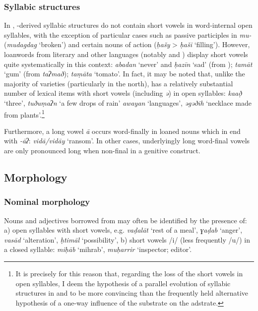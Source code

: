 \documentclass[output=paper]{langsci/langscibook}
\begin{document}
\subsubsection{Syllabic structures} %

In , -derived syllabic structures do not contain short vowels in word-internal open syllables, with the exception of particular cases such as {passive} participles in \textit{mu-} (\textit{mudagdag} ‘broken’) and certain nouns of action (\textit{ḥašy} > \textit{ḥaši} ‘filling’). However, {loanwords} from literary  and other languages (notably  and ) display short vowels quite systematically in this context: \textit{abadan} ‘never’ and \textit{ḥazīn} ‘sad’ (from  ); \textit{tamāt} ‘gum’ (from  \textit{taʔmað}); \textit{taṃāta} ‘tomato’. In fact, it may be noted that, unlike the majority of  varieties (particularly in the north),  has a relatively substantial number of lexical items with short vowels (including \textit{ə}) in open syllables: \textit{ka{\R}að̣} ‘three’, \textit{tuðu}\textit{ṃaʔn} ‘a few drops of rain’ \textit{awayan} ‘languages’, \textit{əgəðih} ‘necklace made from plants'.\footnote{It is precisely for this reason that, regarding the loss of the short vowels in open syllables, I deem the hypothesis of a parallel evolution of syllabic structures in   and  to be more convincing than the frequently held alternative hypothesis of a one-way influence of the  {substrate} on the  {adstrate}.} 

Furthermore, a {long vowel} \textit{ā} occurs word-finally in loaned nouns which in   end with \textit{{}-āʔ}: \textit{vidā/vidāy} ‘ransom’. In other cases, underlyingly long word-final vowels are only pronounced long when non-final in a genitive construct.

\subsection{Morphology} %

\subsubsection{Nominal morphology} %


Nouns and adjectives borrowed from   may often be identified by the presence of: a) open syllables with short vowels, e.g. \textit{vaḍa}\textit{lāt} ‘rest of a meal’, \textit{ɣaḍab} ‘anger’, \textit{vasād} ‘alteration’, \textit{ḥtimāl} ‘possibility’, b) short vowels /i/ (less frequently /u/) in a closed syllable: \textit{miḥ{\R}āb} ‘mihrab’, \textit{muḥarrir} ‘inspector; editor’.
\end{document}
